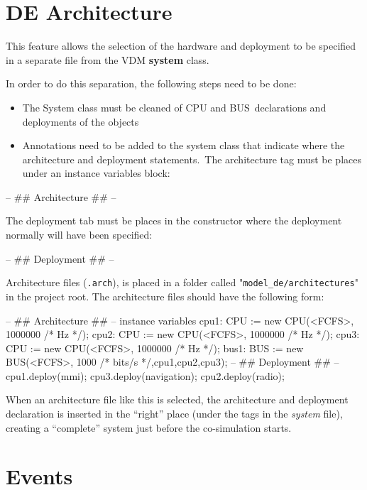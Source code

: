 \documentclass{crescendorepchap}
\newcommand{\vdmkeyw}[1]{{\bf\ttfamily #1}}
\begin{document}
\section{DE Architecture}\label{sec:DEArch}

This feature allows the selection of the hardware and deployment to be
specified in a separate file from the VDM \vdmkeyw{system} class.

In order to do this separation, the following steps need to be done:

\begin{itemize}
\item
  The System class must be cleaned of CPU and BUS~declarations and
  deployments of the objects
\item
  Annotations need to be added to the system class that indicate where
  the architecture and deployment statements.~The architecture tag must
  be places under an instance variables block:
\end{itemize}

\begin{vdmrt}
-- ## Architecture ## -- 
\end{vdmrt}

The deployment tab must be places in the constructor where the
deployment normally will have been specified:

\begin{vdmrt}
-- ## Deployment ## -- 
\end{vdmrt}

Architecture files (\texttt{.arch}), is placed in a folder called
"\texttt{model\_de/architectures}" in the project root. The
architecture files should have the following form:

\begin{vdmrt}
-- ## Architecture ## --
instance variables
cpu1: CPU := new CPU(<FCFS>, 1000000 /* Hz */);
cpu2: CPU := new CPU(<FCFS>, 1000000 /* Hz */);
cpu3: CPU := new CPU(<FCFS>, 1000000 /* Hz */);
bus1: BUS := new BUS(<FCFS>, 1000 /* bits/s */,{cpu1,cpu2,cpu3});
-- ## Deployment ## --
cpu1.deploy(mmi);
cpu3.deploy(navigation);
cpu2.deploy(radio);
\end{vdmrt}

When an architecture file like this is selected, the architecture and
deployment declaration is inserted in the ``right'' place (under the
tags in the \emph{system} file), creating a ``complete'' system just
before the co-simulation starts.

\section{Events}
\end{document}
